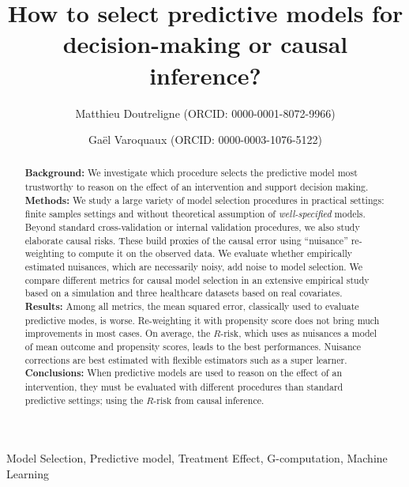 \documentclass[a4paper,num-refs]{oup-contemporary}%
\title{How to select predictive models for decision-making or causal inference?}
\author[1,\authfn{1}]{Matthieu Doutreligne (ORCID: 0000-0001-8072-9966)}
\author[2]{Gaël Varoquaux (ORCID: 0000-0003-1076-5122)}
\affil[1]{Soda, Inria Saclay, France}
\affil[2]{Mission Data, Haute Autorité de Santé, France}
\newcommand{\eg}{\emph{e.g.}}
\begin{document}
\begin{frontmatter}
    \maketitle
    \begin{abstract}
        \textbf{Background:}
        We investigate which procedure selects the predictive model most
        trustworthy to reason on the effect of an intervention and support
        decision making.\\
        \textbf{Methods:}
        We study a large variety of model selection procedures in practical settings:
        finite samples settings and without theoretical assumption of
        \emph{well-specified} models. Beyond standard cross-validation or
        internal validation procedures, we also study elaborate causal risks.
        These build proxies of the causal error using ``nuisance''
        re-weighting to compute it on the observed data. We evaluate whether
        empirically estimated nuisances, which are necessarily noisy,
        add noise to model selection. We compare different metrics for
        causal model selection in an extensive empirical
        study based on a simulation and three healthcare datasets
        based on real covariates. \\
        \textbf{Results:} Among all metrics, the mean squared error,
        classically used to evaluate predictive modes,
        is worse. Re-weighting it with propensity score
        does not bring much improvements in most cases. On average, the
        $R\text{-risk}$, which uses as nuisances a model of
        mean outcome and propensity scores, leads to the best performances.
        Nuisance corrections are best estimated with flexible estimators such
        as a super learner.
        \\
        \textbf{Conclusions:} When predictive models are used to
        reason on the effect of an intervention, they must be evaluated
        with different procedures than standard predictive
        settings; using the $R\text{-risk}$ from causal inference.
    \end{abstract}

    \begin{keywords}
        Model Selection, Predictive model, Treatment Effect, G-computation, Machine Learning
    \end{keywords}

\end{frontmatter}
\end{document}
